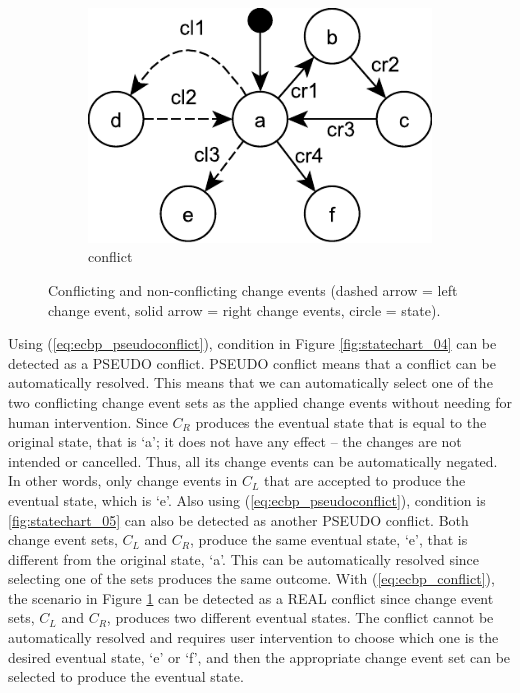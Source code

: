 \begin{figure}[ht]
\begin{subfigure}[t]{0.48\linewidth}
    \includegraphics[width=\linewidth]{statechart_06}
    \caption{conflict}
    \label{fig:statechart_06}
  \end{subfigure}
  \caption{Conflicting and non-conflicting change events (dashed arrow = left change event, solid arrow = right change events, circle = state).}
  \label{fig:conflict_states}
\end{figure}

Using (\ref{eq:ecbp_pseudoconflict}), condition in Figure \ref{fig:statechart_04} can be detected as a \textsf{PSEUDO} conflict. \textsf{PSEUDO} conflict means that a conflict can be automatically resolved. This means that we can automatically select one of the two conflicting change event sets as the applied change events without needing for human intervention. Since $C_{R}$ produces the eventual state that is equal to the original state, that is `a'; it does not have any effect -- the changes are not intended or cancelled. Thus, all its change events can be automatically negated. In other words, only change events in $C_{L}$ that are accepted to produce the eventual state, which is `e'. Also using (\ref{eq:ecbp_pseudoconflict}), condition is \ref{fig:statechart_05} can also be detected as another \textsf{PSEUDO} conflict. Both change event sets, $C_{L}$ and $C_{R}$, produce the same eventual state, `e', that is different from the original state, `a'. This can be automatically resolved since selecting one of the sets produces the same outcome. With (\ref{eq:ecbp_conflict}), the scenario in Figure \ref{fig:statechart_06} can be detected as a \textsf{REAL} conflict since change event sets, $C_{L}$ and $C_{R}$, produces two different eventual states. The conflict cannot be automatically resolved and requires user intervention to choose which one is the desired eventual state, `e' or `f', and then the appropriate change event set can be selected to produce the eventual state.

